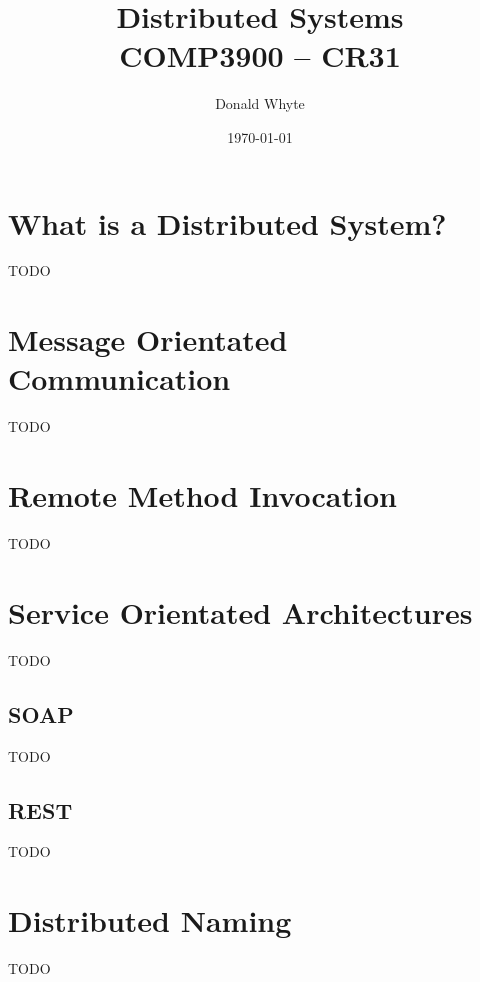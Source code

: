 \documentclass{article}
\title{Distributed Systems \\ COMP3900 -- CR31}
\author{Donald Whyte}
\date{\today}
\begin{document}
\maketitle


\pagebreak
\tableofcontents

\pagebreak
\listoffigures

\pagebreak
\listoftables

\pagebreak

\section{What is a Distributed System?}

TODO

\section{Message Orientated Communication}

TODO

\section{Remote Method Invocation}

TODO

\section{Service Orientated Architectures}

TODO

\subsection{SOAP}

TODO

\subsection{REST}

TODO

\section{Distributed Naming}

TODO
\end{document}
